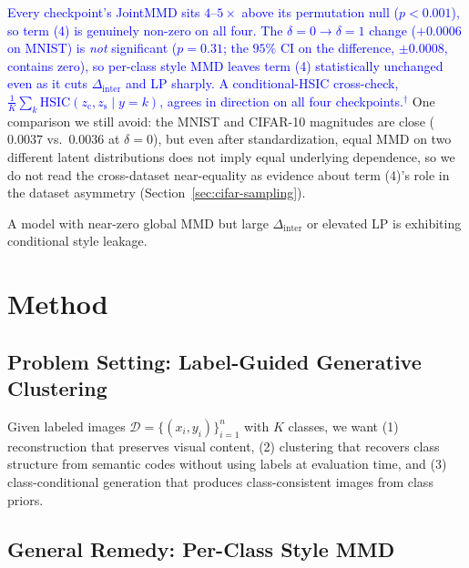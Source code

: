 \documentclass[10pt,letterpaper]{article}
\newcommand{\zc}{z_{\mathrm{c}}}
\newcommand{\zs}{z_{\mathrm{s}}}
\newcommand{\HSIC}{\mathrm{HSIC}}
\newcommand{\pj}[1]{\textcolor{blue}{#1$^{\dagger}$}}
\begin{document}
\pj{Every checkpoint's JointMMD sits $4$--$5\times$ above its permutation
null ($p<0.001$), so term (4) is genuinely non-zero on all four. The
$\delta{=}0\to\delta{=}1$ change ($+0.0006$ on MNIST) is \emph{not}
significant ($p{=}0.31$; the $95\%$ CI on the difference,
$\pm0.0008$, contains zero), so per-class style MMD leaves term (4)
statistically unchanged even as it cuts $\Delta_{\mathrm{inter}}$ and LP
sharply. A conditional-HSIC cross-check,
$\frac1K\sum_k\HSIC(\zc,\zs\mid y{=}k)$, agrees in direction on all four
checkpoints.} One comparison we still avoid: the MNIST and CIFAR-10
magnitudes are close ($0.0037$ vs.\ $0.0036$ at $\delta{=}0$), but even
after standardization, equal MMD on two different latent distributions does
not imply equal underlying dependence, so we do not read the cross-dataset
near-equality as evidence about term (4)'s role in the dataset asymmetry
(Section~\ref{sec:cifar-sampling}).

A model with near-zero global MMD but large $\Delta_{\mathrm{inter}}$ or
elevated LP is exhibiting conditional style leakage.

\section{Method}
\label{sec:method}

\subsection{Problem Setting: Label-Guided Generative Clustering}

Given labeled images $\mathcal{D}=\{(x_i,y_i)\}_{i=1}^n$ with $K$ classes,
we want (1) reconstruction that preserves visual content, (2) clustering
that recovers class structure from semantic codes without using labels at
evaluation time, and (3) class-conditional generation that produces
class-consistent images from class priors.

\subsection{General Remedy: Per-Class Style MMD}
\label{sec:general-remedy}
\end{document}
